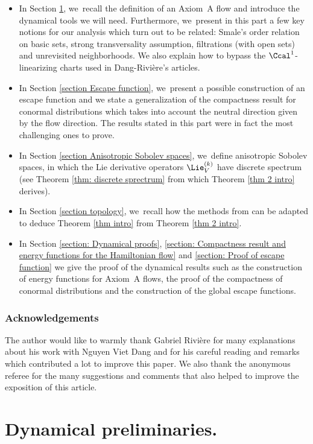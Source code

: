 \begin{itemize}
\item In Section \ref{section Dynamical preliminaries}, we~recall the definition of an Axiom~A flow and introduce the dynamical tools we will need. Furthermore, we~present in this part a few key notions for our analysis which turn out to be related: Smale's order relation on basic sets, strong transversality assumption, filtrations (with open sets) and unrevisited neighborhoods. We also explain how to bypass the $\Ccal^1$-linearizing charts used in Dang-Rivière's articles.
\item In Section \ref{section Escape function}, we~present a possible construction of an escape function and we state a generalization of the compactness result for conormal distributions which takes into account the neutral direction given by the flow direction. The results stated in this part were in fact the most challenging ones to prove.
\item In Section \ref{section Anisotropic Sobolev spaces}, we~define anisotropic Sobolev spaces, in which the Lie derivative operators $\Lie_V^{(k)}$ have discrete spectrum (see Theorem \ref{thm: discrete sprectrum} from which Theorem \ref{thm 2 intro} derives).
\item In Section \ref{section topology}, we~recall how the methods from \cite{DR0, DRIII} can be adapted to deduce Theorem \ref{thm intro} from Theorem \ref{thm 2 intro}.
\item In Section \ref{section: Dynamical proofs}, \ref{section: Compactness result and energy functions for the Hamiltonian flow} and \ref{section: Proof of escape function} we give the proof of the dynamical results such as the construction of energy functions for Axiom~A flows, the proof of the compactness of conormal distributions and the construction of the global escape functions.
\end{itemize}

\subsubsection*{Acknowledgements} The author would like to warmly thank Gabriel Rivière for many explanations about his work with Nguyen Viet Dang and for his careful reading and remarks which contributed a lot to improve this paper. We also thank the anonymous referee for the many suggestions and comments that also helped to improve the exposition of this article.

\section{Dynamical preliminaries.}\label{section Dynamical preliminaries}

